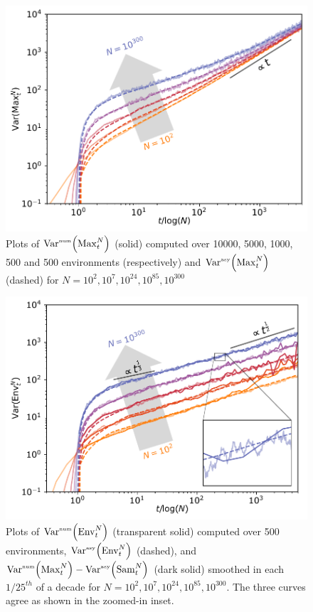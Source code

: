 \documentclass[%
 reprint,
 amsmath,amssymb,
 longbibliography,
 aps,
prl
]{revtex4-1}
\newcommand{\varasy}[1]{\mathrm{Var}^{\textrm{\tiny{asy}}}\!\left(#1\right)}
\newcommand{\varnum}[1]{\mathrm{Var}^{\textrm{\tiny{num}}}\!\left(#1\right)}
\def\maxnt{\mathrm{Max}^{N}_t}
\def\envnt{\mathrm{Env}^{N}_t}
\def\snt{\mathrm{Sam}^{N}_t}
\begin{document}
\begin{figure}[h]
 \includegraphics[width=\columnwidth]{MaxVar.pdf}
 \caption{Plots of $\varnum{\maxnt}$ (solid) computed over 10000, 5000, 1000, 500 and 500 environments (respectively) and  $\varasy{\maxnt}$ (dashed) for $N=10^2, 10^{7}, 10^{24}, 10^{85}, 10^{300}$}
 \label{fig:MaxVar}
\end{figure}

\begin{figure}[h]
	\includegraphics[width=\columnwidth]{QuantileVar.pdf}
	\caption{Plots of $\varnum{\envnt}$ (transparent solid) computed over 500 environments, $\varasy{\envnt}$ (dashed), and $\varnum{\maxnt} - \varasy{\snt}$ (dark solid) smoothed in each $1/25^{th}$ of a decade for $N=10^2, 10^{7}, 10^{24}, 10^{85},10^{300}$. The three curves agree as shown in the zoomed-in inset.}
	\label{fig:QuantileVar}
\end{figure}
\end{document}
